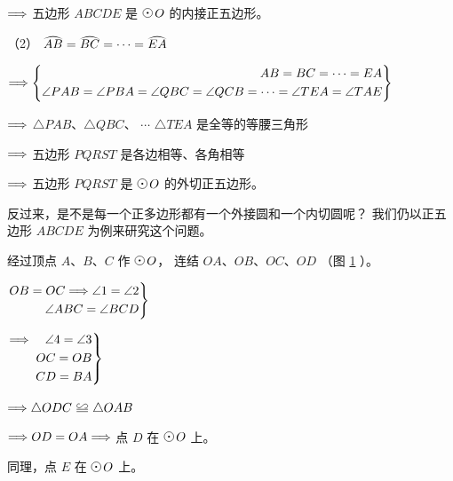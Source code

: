\quad $\Longrightarrow$ 五边形 $ABCDE$ 是 $\yuan\,O$ 的内接正五边形。


（2） $\yuanhu{AB} = \yuanhu{BC} = \cdots = \yuanhu{EA}$

\quad $\Longrightarrow \left\{\begin{aligned}
    AB = BC = \cdots = EA \\
    \angle PAB = \angle PBA = \angle QBC = \angle QCB = \cdots = \angle TEA = \angle TAE
\end{aligned}\right\}$

\quad $\Longrightarrow$ $\triangle PAB$、$\triangle QBC$、 $\cdots$ $\triangle TEA$ 是全等的等腰三角形

\quad $\Longrightarrow$ 五边形 $PQRST$ 是各边相等、各角相等

\quad $\Longrightarrow$ 五边形 $PQRST$ 是 $\yuan\,O$ 的外切正五边形。

\begin{figure}[htbp]
    \centering
    \begin{minipage}[b]{7cm}
        \centering
        
        \caption{}\label{fig:czjh2-7-64}
    \end{minipage}
    \qquad
    \begin{minipage}[b]{7.2cm}
        \centering
        
        \caption{}\label{fig:czjh2-7-65}
    \end{minipage}
\end{figure}

反过来，是不是每一个正多边形都有一个外接圆和一个内切圆呢？
我们仍以正五边形 $ABCDE$ 为例来研究这个问题。

经过顶点 $A$、$B$、$C$ 作 $\yuan\,O$， 连结 $OA$、$OB$、$OC$、$OD$ （图 \ref{fig:czjh2-7-65} ）。

$\left.\begin{aligned}
    OB = OC \Longrightarrow \angle 1 = \angle 2 \\
    \angle ABC = \angle BCD
\end{aligned}\right\}$

\qquad $\left.\begin{aligned}
    \Longrightarrow \quad \angle 4 = \angle 3 \\
    OC = OB \\
    CD = BA
\end{aligned}\right\}$

\qquad $\tuichu \triangle ODC \quandeng \triangle OAB$

\qquad $\Longrightarrow OD = OA \Longrightarrow  $ 点 $D$ 在 $\yuan\,O$ 上。

同理，点 $E$ 在 $\yuan\,O$ 上。


